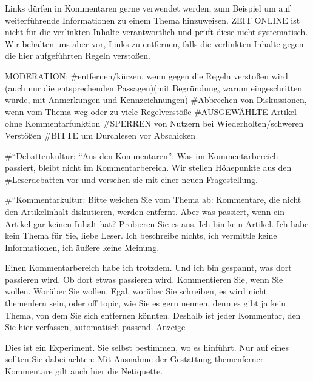 Links dürfen in Kommentaren gerne verwendet werden, zum Beispiel um auf weiterführende Informationen zu einem Thema hinzuweisen. ZEIT ONLINE ist nicht für die verlinkten Inhalte verantwortlich und prüft diese nicht systematisch. Wir behalten uns aber vor, Links zu entfernen, falls die verlinkten Inhalte gegen die hier aufgeführten Regeln verstoßen.



MODERATION:
#entfernen/kürzen, wenn gegen die Regeln verstoßen wird (auch nur die entsprechenden Passagen)(mit Begründung, warum eingeschritten wurde, mit Anmerkungen und Kennzeichnungen)
#Abbrechen von Diskussionen, wenn vom Thema weg oder zu viele Regelverstöße
#AUSGEWÄHLTE Artikel ohne Kommentarfunktion
#SPERREN von Nutzern bei Wiederholten/schweren Verstößen
#BITTE um Durchlesen vor Abschicken

#``Debattenkultur: ``Aus den Kommentaren'': Was im Kommentarbereich passiert, bleibt nicht im Kommentarbereich. Wir stellen Höhepunkte aus den  #Leserdebatten vor und versehen sie mit einer neuen Fragestellung.


#``Kommentarkultur: Bitte weichen Sie vom Thema ab: Kommentare, die nicht den Artikelinhalt diskutieren, werden entfernt. Aber was passiert, wenn ein Artikel gar keinen Inhalt hat? Probieren Sie es aus. Ich bin kein Artikel. Ich habe kein Thema für Sie, liebe Leser. Ich beschreibe nichts, ich vermittle keine Informationen, ich äußere keine Meinung.

Einen Kommentarbereich habe ich trotzdem. Und ich bin gespannt, was dort passieren wird. Ob dort etwas passieren wird. Kommentieren Sie, wenn Sie wollen. Worüber Sie wollen. Egal, worüber Sie schreiben, es wird nicht themenfern sein, oder off topic, wie Sie es gern nennen, denn es gibt ja kein Thema, von dem Sie sich entfernen könnten. Deshalb ist jeder Kommentar, den Sie hier verfassen, automatisch passend.
Anzeige

Dies ist ein Experiment. Sie selbst bestimmen, wo es hinführt. Nur auf eines sollten Sie dabei achten: Mit Ausnahme der Gestattung themenferner Kommentare gilt auch hier die Netiquette.

















